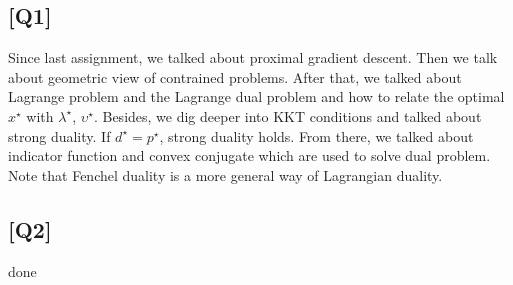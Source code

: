 \documentclass[12pt, a4 paper]{article}
\begin{document}
    \begin{framed}
        \section{[Q1]}
        Since last assignment, we talked about proximal gradient
        descent. Then we talk about geometric view of contrained 
        problems. After that, we talked about Lagrange problem and
        the Lagrange dual problem and how to relate the optimal
        $x^{\star}$ with $\lambda^{\star}$, $\upsilon^{\star}$. Besides,
        we dig deeper into KKT conditions and talked about strong duality.
        If $d^{\star}  = p^{\star}$, strong duality holds. From there,
        we talked about indicator function and convex conjugate which are 
        used to solve dual problem. Note that Fenchel duality is a more
        general way of Lagrangian duality.
    \end{framed}

    \begin{framed}
        \section{[Q2]}
        done
    \end{framed}
\end{document}
